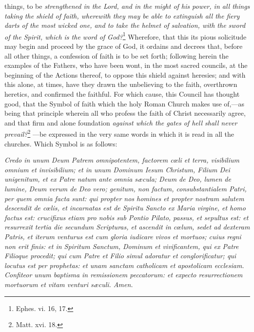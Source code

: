 things, to be \emph{strengthened in the Lord, and in the might of his power, in all things taking the shield of faith, wherewith they may be able to extinguish all the fiery darts of the most wicked one, and to take the helmet of salvation, with the sword of the Spirit, which is the word of God?}\footnote{\par   Ephes. vi. 16, 17.} Wherefore, that this its pious solicitude may begin and proceed by the grace of God, it ordains and decrees that, before all other things, a confession of faith is to be set forth; following herein the examples of the Fathers, who have been wont, in the most sacred councils, at the beginning of the Actions thereof, to oppose this shield against heresies; and with this alone, at times, have they drawn the unbelieving to the faith, overthrown heretics, and confirmed the faithful. For which cause, this Council has thought good, that the Symbol of faith which the holy Roman Church makes use of,—as being that principle wherein all who profess the faith of Christ necessarily agree, and that firm and alone foundation \emph{against which the gates of hell shall never prevail?}\footnote{\par   Matt. xvi. 18.} —be expressed in the very same words in which it is read in all the churches. Which Symbol is as follows:

\emph{Credo in unum Deum Patrem omnipotentem, factorem cœli et terra, visibilium omnium et invisibilium; et in unum Dominum Iesum Christum, Filium Dei unigenitum, et ex Patre natum ante omnia sæcula; Deum de Deo, lumen de lumine, Deum verum de Deo vero; genitum, non factum, consubstantialem Patri, per quem omnia facta sunt: qui propter nos homines et propter nostram salutem descendit de cœlis, et incarnatas est de Spiritu Sancto ex Maria virgine, et homo factus est: crucifixus etiam pro nobis sub Pontio Pilato, passus, et sepultus est: et resurrexit tertia die secundum Scripturas, et ascendit in cœlum, sedet ad dexteram Patris, et iterum venturus est cum gloria iudicare vivos et mortuos; cuius regni non erit finis: et in Spiritum Sanctum, Dominum et vivificantem, qui ex Patre Filioque procedit; qui cum Patre et Filio simul adoratur et conglorificatur; qui locutus est per prophetas: et unam sanctam catholicam et apostolicam ecclesiam. Confiteor unum baptisma in remissionem peccatorum: et expecto resurrectionem mortuorum et vitam venturi sæculi. Amen. }

